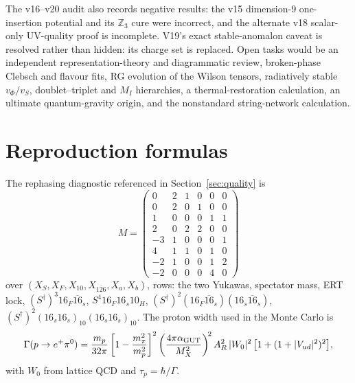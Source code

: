 \documentclass[11pt,a4paper]{article}
\begin{document}
The v16--v20 audit also records negative results: the v15 dimension-9
one-insertion potential and its $\mathbb Z_3$ cure were incorrect, and the
alternate v18 scalar-only UV-quality proof is incomplete. V19's exact
stable-anomalon caveat is resolved rather than hidden: its charge set is
replaced. Open tasks would be an independent
representation-theory and diagrammatic review, broken-phase Clebsch and
flavour fits, RG evolution of the Wilson tensors, radiatively stable
$v_\Phi/v_S$, doublet--triplet and $M_I$ hierarchies, a thermal-restoration
calculation, an ultimate
quantum-gravity origin, and the nonstandard string-network calculation.

\appendix
\section{Reproduction formulas}
The rephasing diagnostic referenced in Section~\ref{sec:quality} is
\begin{equation}
M =
\begin{pmatrix}
0 & 2 & 1 & 0 & 0 & 0\\
0 & 2 & 0 & 1 & 0 & 0\\
1 & 0 & 0 & 0 & 1 & 1\\
2 & 0 & 2 & 2 & 0 & 0\\
-3 & 1 & 0 & 0 & 0 & 1\\
4 & 1 & 1 & 0 & 1 & 0\\
-2 & 1 & 0 & 0 & 1 & 2\\
-2 & 0 & 0 & 0 & 4 & 0
\end{pmatrix}
\end{equation}
over $(X_S, X_F, X_{10}, X_{\overline{126}}, X_a, X_b)$, rows: the two
Yukawas, spectator mass, ERT lock, $(S^\dagger)^3 16_F\overline{16}_s$,
$S^4 16_F 16_s 10_H$,
$(S^\dagger)^2(16_F\overline{16}_s)(16_s\overline{16}_s)$,
$(S^\dagger)^2(16_s16_s)_{10}(16_s16_s)_{10}$. The proton width used in
the Monte Carlo is
\begin{equation}
\Gamma(p\to e^+\pi^0) = \frac{m_p}{32\pi}
\left[1-\frac{m_\pi^2}{m_p^2}\right]^2
\left(\frac{4\pi\alpha_{\rm GUT}}{M_X^2}\right)^{\!2}
A_R^2\,|W_0|^2\,\bigl[1+(1+|V_{ud}|^2)^2\bigr],
\end{equation}
with $W_0$ from lattice QCD \cite{Yoo} and $\tau_p = \hbar/\Gamma$.

\clearpage
\end{document}
